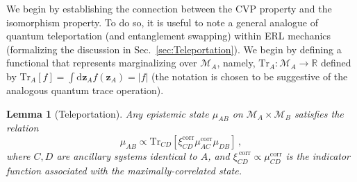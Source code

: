 \documentclass[pra,superscriptaddress,nofootinbib,12pt]{revtex4-2}
\newtheorem{lemma}[theorem]{Lemma}
\begin{document}


We begin by establishing the connection between the CVP property and the isomorphism property.  To do so, it is useful to note a general analogue of quantum teleportation (and entanglement swapping) within ERL mechanics (formalizing the discussion in Sec.~\ref{sec:Teleportation}).  We begin by defining a functional that represents marginalizing over $\mathcal{M}_A$, namely, $\mathrm{Tr}_A: \mathcal{M}_A \to \mathbb{R}$ defined by $\mathrm{Tr}_A[f] = \int \textrm{d}\mathbf{z}_A f(\mathbf{z}_A) = |f|$ (the notation is chosen to be suggestive of the analogous quantum trace operation).
\begin{lemma}[Teleportation]\label{lemma:swap}
Any epistemic state $\mu_{AB}$ on $\mathcal{M}_{A}\times \mathcal{M}_{B}$
satisfies the relation
\begin{equation}
\mu _{AB} \propto \textrm{Tr}_{CD} [\xi_{CD}^{\mathrm{corr} } \mu _{AC}^{\mathrm{corr}} \mu _{DB}]\,,
\end{equation}
where $C,D$ are ancillary systems identical to $A$, and $\xi_{CD}^{\mathrm{\
corr}} \propto \mu _{CD}^{\mathrm{corr}}$ is the indicator function associated with the maximally-correlated state.
\end{lemma}
\end{document}
